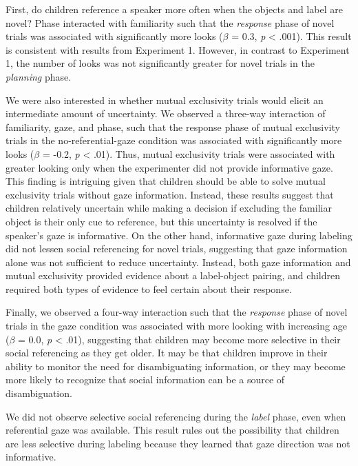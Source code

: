 \documentclass[a4paper,man,apacite,floatsintext]{apa6}
\begin{document}
First, do children reference a speaker more often when the objects and
label are novel? Phase interacted with familiarity such that the
\emph{response} phase of novel trials was associated with significantly
more looks (\(\beta\) = 0.3, \emph{p} \textless{} .001). This result is
consistent with results from Experiment 1. However, in contrast to
Experiment 1, the number of looks was not significantly greater for
novel trials in the \emph{planning} phase.

We were also interested in whether mutual exclusivity trials would
elicit an intermediate amount of uncertainty. We observed a three-way
interaction of familiarity, gaze, and phase, such that the response
phase of mutual exclusivity trials in the no-referential-gaze condition
was associated with significantly more looks (\(\beta\) = -0.2, \emph{p}
\textless{} .01). Thus, mutual exclusivity trials were associated with
greater looking only when the experimenter did not provide informative
gaze. This finding is intriguing given that children should be able to
solve mutual exclusivity trials without gaze information. Instead, these
results suggest that children relatively uncertain while making a
decision if excluding the familiar object is their only cue to
reference, but this uncertainty is resolved if the speaker's gaze is
informative. On the other hand, informative gaze during labeling did not
lessen social referencing for novel trials, suggesting that gaze
information alone was not sufficient to reduce uncertainty. Instead,
both gaze information and mutual exclusivity provided evidence about a
label-object pairing, and children required both types of evidence to
feel certain about their response.

Finally, we observed a four-way interaction such that the
\emph{response} phase of novel trials in the gaze condition was
associated with more looking with increasing age (\(\beta\) = 0.0,
\emph{p} \textless{} .01), suggesting that children may become more
selective in their social referencing as they get older. It may be that
children improve in their ability to monitor the need for disambiguating
information, or they may become more likely to recognize that social
information can be a source of disambiguation.

We did not observe selective social referencing during the \emph{label}
phase, even when referential gaze was available. This result rules out
the possibility that children are less selective during labeling because
they learned that gaze direction was not informative.
\end{document}
